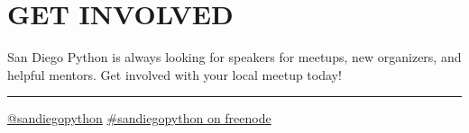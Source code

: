 \documentclass[letterpaper,12pt]{article}
\begin{document}
  \section*{GET INVOLVED}
  San Diego Python is always looking for speakers for meetups, new organizers,
  and helpful mentors. Get involved with your local meetup today!


  \vspace{10pt}
  {\rule{\textwidth}{0.5pt}}
  \href{https://twitter.com/sandiegopython}{@sandiegopython} \hfill 
  \href{irc://irc.freenode.net/sandiegopython}{\#sandiegopython on freenode}
\end{document}
